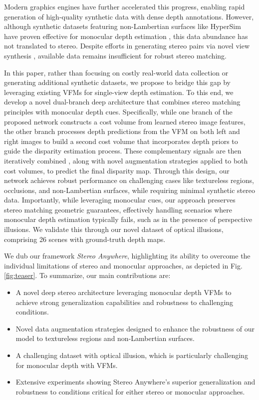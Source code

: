 \documentclass[10pt,twocolumn,letterpaper]{article}
\newcommand{\method}[0]{Stereo Anywhere\xspace}
\begin{document}
Modern graphics engines have further accelerated this progress, enabling rapid generation of high-quality synthetic data with dense depth annotations. However, although synthetic datasets featuring non-Lambertian surfaces like HyperSim \cite{roberts2021} have proven effective for monocular depth estimation \cite{Ramirez_2023_CVPR,Ramirez2024,zamaramirez2024tricky}, this data abundance has not translated to stereo. Despite efforts in generating stereo pairs via novel view synthesis \cite{Tosi_2023_CVPR,gjerde2024nerf,ling2024self}, available data remains insufficient for robust stereo matching.

In this paper, rather than focusing on costly real-world data collection or generating additional synthetic datasets, we propose to bridge this gap by leveraging existing VFMs for single-view depth estimation.
To this end, we develop a novel dual-branch deep architecture that combines stereo matching principles with monocular depth cues.
Specifically, while one branch of the proposed network constructs a cost volume from learned stereo image features, the other branch processes depth predictions from the VFM on both left and right images to build a second cost volume that incorporates depth priors to guide the disparity estimation process. These complementary signals are then iteratively combined \cite{lipson2021raft}, along with novel augmentation strategies applied to both cost volumes, to predict the final disparity map. Through this design, our network achieves robust performance on challenging cases like textureless regions, occlusions, and non-Lambertian surfaces, while requiring minimal synthetic stereo data. Importantly, while leveraging monocular cues, our approach preserves stereo matching geometric guarantees, effectively handling scenarios where monocular depth estimation typically fails, such as in the presence of perspective illusions. We validate this through our novel dataset of optical illusions, comprising 26 scenes with ground-truth depth maps.

We dub our framework \textit{\method}, highlighting its ability to overcome the individual limitations of stereo and monocular approaches, as depicted in Fig. \ref{fig:teaser}. To summarize, our main contributions are:

\begin{itemize}
    \item A novel deep stereo architecture leveraging monocular depth VFMs to achieve strong generalization capabilities and robustness to challenging conditions.
    \item Novel data augmentation strategies designed to enhance the robustness of our model to textureless regions and non-Lambertian surfaces.
    \item A challenging dataset with optical illusion, which is particularly challenging for monocular depth with VFMs.
    \item Extensive experiments showing \method's superior generalization and robustness to conditions critical for either stereo or monocular approaches.
\end{itemize}
\end{document}
